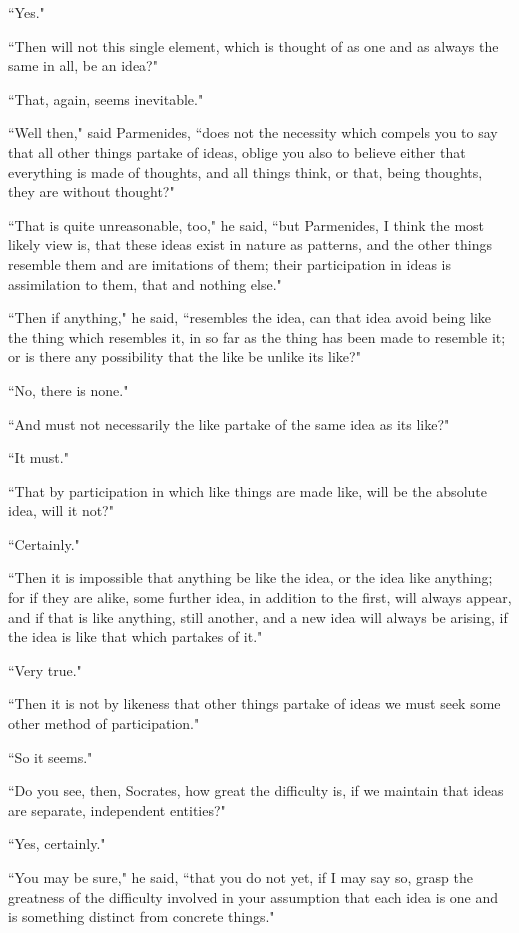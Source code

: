 \documentclass[letterpaper,12pt]{article}
\newcommand{\stephpag}[1]{\marginnote{\small\itshape\fontfamily{ppl}\selectfont #1}}
\begin{document}
``Yes."

``Then will not this single element, which is thought of as one and as always the same in all, be an idea?"

``That, again, seems inevitable."

``Well then," said Parmenides, ``does not the necessity which compels you to say that all other things partake of ideas, oblige you also to believe either that everything is made of thoughts, and all things think, or that, being thoughts, they are without thought?"

``That is quite unreasonable, too," he said, \stephpag{d} ``but Parmenides, I think the most likely view is, that these ideas exist in nature as patterns, and the other things resemble them and are imitations of them; their participation in ideas is assimilation to them, that and nothing else."

``Then if anything," he said, ``resembles the idea, can that idea avoid being like the thing which resembles it, in so far as the thing has been made to resemble it; or is there any possibility that the like be unlike its like?"

``No, there is none."

``And must not necessarily the like partake of \stephpag{e} the same idea as its like?"

``It must."

``That by participation in which like things are made like, will be the absolute idea, will it not?"

``Certainly."

``Then it is impossible that anything be like the idea, or the idea like anything; for if they are alike, some further idea, in addition to the first, will always appear, and if that is like anything, still another, \stephpag{133 a} and a new idea will always be arising, if the idea is like that which partakes of it."

``Very true."

``Then it is not by likeness that other things partake of ideas we must seek some other method of participation."

``So it seems."

``Do you see, then, Socrates, how great the difficulty is, if we maintain that ideas are separate, independent entities?"

``Yes, certainly."

``You may be sure," he said, ``that you do not yet, if I may say so, \stephpag{b} grasp the greatness of the difficulty involved in your assumption that each idea is one and is something distinct from concrete things."
\end{document}
